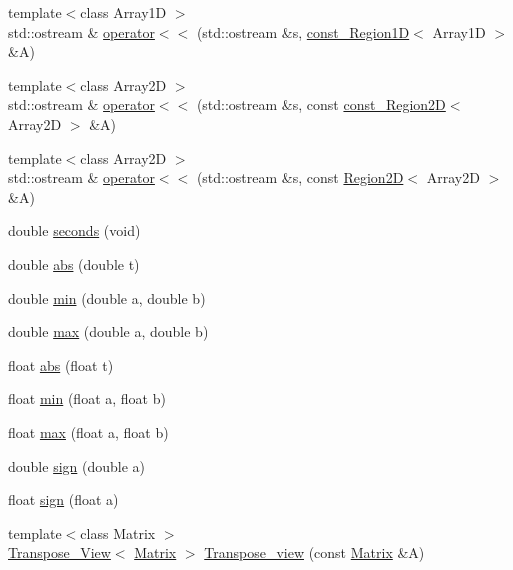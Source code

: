 \begin{DoxyCompactItemize}
\item 
{\footnotesize template$<$class Array1D $>$ }\\std::ostream \& \hyperlink{namespace_t_n_t_ae3af55d8815b3c1457a6db67c8ad52cf}{operator$<$$<$} (std::ostream \&s, \hyperlink{class_t_n_t_1_1const___region1_d}{const\_\-Region1D}$<$ Array1D $>$ \&A)
\item 
{\footnotesize template$<$class Array2D $>$ }\\std::ostream \& \hyperlink{namespace_t_n_t_a4f9e4a9799d18b07882e274dab0acd47}{operator$<$$<$} (std::ostream \&s, const \hyperlink{class_t_n_t_1_1const___region2_d}{const\_\-Region2D}$<$ Array2D $>$ \&A)
\item 
{\footnotesize template$<$class Array2D $>$ }\\std::ostream \& \hyperlink{namespace_t_n_t_a83a5889e28705935e52367d1951ea254}{operator$<$$<$} (std::ostream \&s, const \hyperlink{class_t_n_t_1_1_region2_d}{Region2D}$<$ Array2D $>$ \&A)
\item 
double \hyperlink{namespace_t_n_t_acda64125650ad55545ea06319a71ffec}{seconds} (void)
\item 
double \hyperlink{namespace_t_n_t_a17457baa8ac851d47ef41cccc17b5135}{abs} (double t)
\item 
double \hyperlink{namespace_t_n_t_a6ff7d17e22c75eb3f9fc404115336c88}{min} (double a, double b)
\item 
double \hyperlink{namespace_t_n_t_a8301e96db6ebead2ce5ab13cfc2593f5}{max} (double a, double b)
\item 
float \hyperlink{namespace_t_n_t_add6aba1405d7b48fe08d8a6e422df7d9}{abs} (float t)
\item 
float \hyperlink{namespace_t_n_t_a1c3e18bd5476f272e0f55977a6205431}{min} (float a, float b)
\item 
float \hyperlink{namespace_t_n_t_a410c74797b51063ddac92537157c69ec}{max} (float a, float b)
\item 
double \hyperlink{namespace_t_n_t_a051812668d41cc65f9b8f0518e47b466}{sign} (double a)
\item 
float \hyperlink{namespace_t_n_t_a06dc1f86f3df1501d7f3e49c89c5bf2a}{sign} (float a)
\item 
{\footnotesize template$<$class Matrix $>$ }\\\hyperlink{class_t_n_t_1_1_transpose___view}{Transpose\_\-View}$<$ \hyperlink{class_t_n_t_1_1_matrix}{Matrix} $>$ \hyperlink{namespace_t_n_t_a5325ff6dafd079320dad52475593f687}{Transpose\_\-view} (const \hyperlink{class_t_n_t_1_1_matrix}{Matrix} \&A)
\item 

\end{DoxyCompactItemize}
